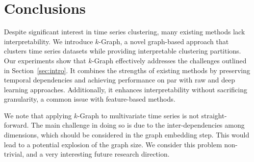 \section{Conclusions}
\label{sec:conclusions}

Despite significant interest in time series clustering, many existing methods lack interpretability. We introduce $k$-Graph, a novel graph-based approach that clusters time series datasets while providing interpretable clustering partitions. Our experiments show that $k$-Graph effectively addresses the challenges outlined in Section~\ref{sec:intro}. It combines the strengths of existing methods by preserving temporal dependencies and achieving performance on par with raw and deep learning approaches. Additionally, it enhances interpretability without sacrificing granularity, a common issue with feature-based methods. 

We note that applying $k$-Graph to multivariate time series is not straight-forward. 
The main challenge in doing so is due to the inter-dependencies among dimensions, which should be considered in the graph embedding step.
This would lead to a potential explosion of the graph size. 
We consider this problem non-trivial, and a very interesting future research direction.
